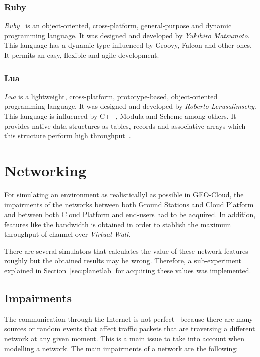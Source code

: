 \subsubsection{Ruby}
\emph{Ruby}~\cite{Community} is an object-oriented, cross-platform, general-purpose and dynamic
programming language. It was designed and developed by \emph{Yukihiro
  Matsumoto}. This language has a dynamic type influenced by Groovy, Falcon and
other ones. It permits an easy, flexible and agile development.


\subsubsection{Lua}
\emph{Lua} is a lightweight, cross-platform, prototype-based, object-oriented programming
language. It was designed and developed by \emph{Roberto Lerusalimschy}. This
language is influenced by C++, Modula and Scheme among others. It provides
native data structures as tables, records and associative arrays which this
structure perform high throughput~\cite{Organization2014}.


\section{Networking}

For simulating an environment as realisticallyl as possible in GEO-Cloud, the impairments  of the networks between both Ground Stations and Cloud Platform
and between both Cloud Platform and end-users had to be acquired. In addition, features
like the bandwidth is obtained in order to stablish the maximum throughput of
channel over \emph{Virtual Wall}.

There are several simulators that
calculates the value of these network features roughly but the obtained results
may be wrong. Therefore, a sub-experiment explained in
Section~\ref{sec:planetlab} for acquiring these values was implemented.

\subsection{Impairments}

The communication through the Internet is not perfect~\cite{Tanenbaum2003} because there are many
sources or random events that affect traffic packets that are traversing a
different network  at any given moment. This is a main issue to take into
account when modelling a network. The main
impairments of a network are the following:

